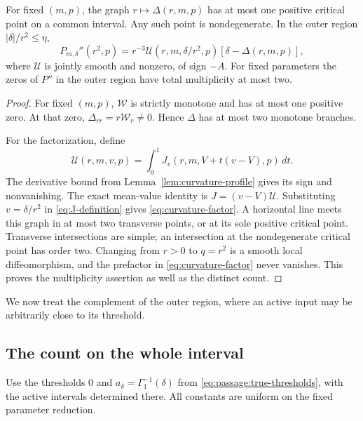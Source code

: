 \begin{proposition}\label{prop:one-fold-graph}
For fixed \((m,p)\), the graph \(r\mapsto\Delta(r,m,p)\) has at most
one positive critical point on a common interval. Any such point
is nondegenerate. In the outer region \(|\delta|/r^2\le\eta\),
\begin{equation}\label{eq:curvature-factor}
 P_{m,\delta}''(r^2,p)
 =r^{-3}\mathcal U(r,m,\delta/r^2,p)
                  [\delta-\Delta(r,m,p)],
\end{equation}
where \(\mathcal U\) is jointly smooth and nonzero, of sign \(-A\).
For fixed parameters the zeros of \(P''\) in the outer region have total
multiplicity at most two.
\end{proposition}

\begin{proof}
For fixed \((m,p)\), \(\mathcal W\) is strictly monotone and has
at most one positive zero. At that zero,
\(\Delta_{rr}=r\mathcal W_r\ne0\). Hence \(\Delta\) has at most
two monotone branches.

For the factorization, define
\[
 \mathcal U(r,m,v,p)
  =\int_0^1J_v(r,m,V+t(v-V),p)\,dt .
\]
The derivative bound from Lemma~\ref{lem:curvature-profile}
gives its sign and nonvanishing. The exact mean-value identity is
\(J=(v-V)\mathcal U\). Substituting
\(v=\delta/r^2\) in \eqref{eq:J-definition} gives
\eqref{eq:curvature-factor}.
A horizontal line meets this graph in at most two transverse
points, or at its sole positive critical point. Transverse intersections are simple;
an intersection at the nondegenerate critical point has order two.
Changing from \(r>0\) to \(q=r^2\) is a smooth local diffeomorphism,
and the prefactor in \eqref{eq:curvature-factor} never vanishes.
This proves the multiplicity assertion as well as the distinct count.
\end{proof}

We now treat the complement of the outer region, where an active input may
be arbitrarily close to its threshold.

\subsection{The count on the whole interval}\label{sec:inner}

Use the thresholds $0$ and $a_\delta=\Gamma_1^{-1}(\delta)$
from \eqref{eq:passage:true-thresholds}, with the active intervals determined
there. All constants are uniform on the fixed parameter reduction.

